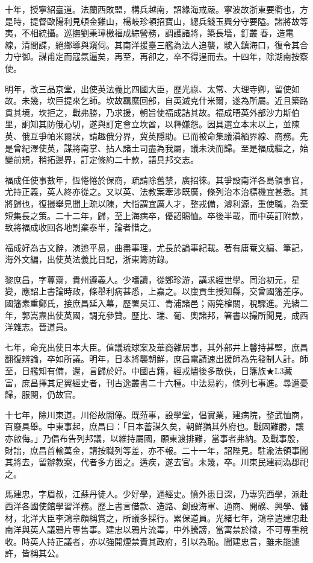 \begin{pinyinscope}
十年，授寧紹臺道。法蘭西敗盟，構兵越南，詔緣海戒嚴。寧波故浙東要衢也，方是時，提督歐陽利見頓金雞山，楊岐珍頓招寶山，總兵錢玉興分守要隘。諸將故等夷，不相統攝。巡撫劉秉璋檄福成綜營務，調護諸將，築長墻，釘叢舂，造電線，清間諜，絕鄉導與窺伺。其南洋援臺三艦為法人追襲，駛入鎮海口，復令其合力守御。謀甫定而寇氛逼矣，再至，再卻之，卒不得逞而去。十四年，除湖南按察使。

明年，改三品京堂，出使英法義比四國大臣，歷光祿、太常、大理寺卿，留使如故。未幾，坎巨提來乞師。坎故羈縻回部，自英滅克什米爾，遂為所屬。近且築路貫其境，坎拒之，戰弗勝，乃求援，朝旨使福成詰其故。福成晤英外部沙力斯伯里，詗知其防俄心切，遂與訂定會立坎酋，以釋嫌怨。因具選立本末以上，並陳英、俄互爭帕米爾狀，請趣俄分界，冀英隱助。已而被命集議滇緬界線、商務。先是曾紀澤使英，謀將南掌、拈人諸土司盡為我屬，議未決而歸。至是福成繼之，始變前規，稍拓邊界，訂定條約二十款，語具邦交志。

福成任使事數年，恆惓惓於保商，疏請除舊禁，廣招徠。其爭設南洋各島領事官，尤持正義，英人終亦從之。又以英、法教案牽涉既廣，條列治本治標機宜甚悉。其將歸也，復撮舉見聞上疏以陳，大恉謂宜厲人才，整戎備，濬利源，重使職，為棄短集長之策。二十二年，歸，至上海病卒，優詔賜恤。卒後半載，而中英訂附款，致將福成收回各地割棄泰半，論者惜之。

福成好為古文辭，演迆平易，曲盡事理，尤長於論事紀載。著有庸菴文編、筆記，海外文編，出使英法義比日記，浙東籌防錄。

黎庶昌，字蓴齋，貴州遵義人。少嗜讀，從鄭珍游，講求經世學。同治初元，星變，應詔上書論時政，條舉利病甚悉，上嘉之。以廩貢生授知縣，交曾國籓差序。國籓素重鄭氏，接庶昌延入幕，歷署吳江、青浦諸邑；兩筦榷關，稅驟進。光緒二年，郭嵩燾出使英國，調充參贊。歷比、瑞、葡、奧諸邦，箸書以撮所聞見，成西洋雜志。晉道員。

七年，命充出使日本大臣。值議琉球案及華商雜居事，其外部井上馨持甚堅，庶昌翻復辨論，卒如所議。明年，日本將襲朝鮮，庶昌電請速出援師為先發制人計。師至，日艦知有備，還，言歸於好。中國古籍，經戎燼後多散佚，日籓族★L3藏富，庶昌擇其足翼經史者，刊古逸叢書二十六種。中法易約，條列七事進。尋遭憂歸，服闋，仍故官。

十七年，除川東道。川俗故闇僿。既蒞事，設學堂，倡實業，建病院，整武恤商，百廢具舉。中東事起，庶昌曰：「日本蓄謀久矣，朝鮮猶其外府也。戰固難勝，讓亦啟侮。」乃倡布告列邦議，以維持屬國，願東渡排難，當事者弗納。及戰事殷，財詘，庶昌首輸萬金，請按職列等差，亦不報。二十一年，詔陛見。駐渝法領事聞其將去，留辦教案，代者多方困之。遘疾，遂去官。未幾，卒。川東民建祠溈郡祀之。

馬建忠，字眉叔，江蘇丹徒人。少好學，通經史。憤外患日深，乃專究西學，派赴西洋各國使館學習洋務。歷上書言借款、造路、創設海軍、通商、開礦、興學、儲材，北洋大臣李鴻章頗稱賞之，所議多採行。累保道員。光緒七年，鴻章遣建忠赴南洋與英人議鴉片專售事。建忠以鴉片流毒，中外騰謗，當寓禁於徵，不可專重稅收。時英人持正議者，亦以強開煙禁責其政府，引以為恥。聞建忠言，雖未能遽許，皆稱其公。


\end{pinyinscope}
